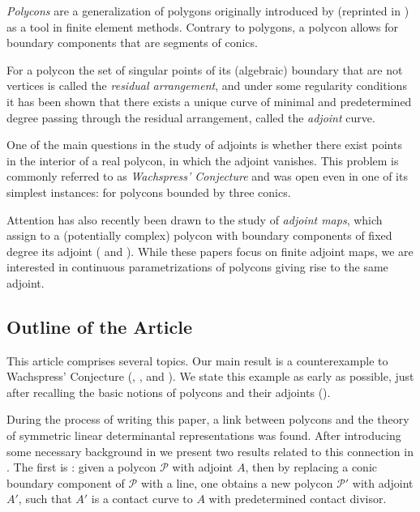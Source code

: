 \documentclass[a4paper,10pt]{amsart}
\theoremstyle{definition}
\theoremstyle{plain}
\newcommand{\cP}{{\mathcal P}}
\begin{document}
\emph{Polycons} are a generalization of polygons originally introduced by \cite{Wachspress1975Adjoints} (reprinted in \cite[Part I]{Wachspress2016Adjoints}) as a tool in finite element methods. Contrary to polygons, a polycon allows for boundary components that are segments of conics.

For a polycon the set of singular points of its (algebraic) boundary that are not vertices is called the \emph{residual arrangement}, and under some regularity conditions it has been shown that there exists a unique curve of minimal and predetermined degree passing through the residual arrangement, called the \emph{adjoint} curve.

One of the main questions in the study of adjoints is whether there exist points in the interior of a real polycon, in which the adjoint vanishes. This problem is commonly referred to as \emph{Wachspress' Conjecture} and was open even in one of its simplest instances: for polycons bounded by three conics.

Attention has also recently been drawn to the study of \emph{adjoint maps}, which assign to a (potentially complex) polycon with boundary components of fixed degree its adjoint (\cite{AgostiniPlaumannSinnWesner2024AdjPolypol} and \cite[\S4]{KohnEtAl2024AdjCurves}). While these papers focus on finite adjoint maps, we are interested in continuous parametrizations of polycons giving rise to the same adjoint.



\subsection{Outline of the Article}

This article comprises several topics. Our main result is a counterexample to Wachspress' Conjecture (, , and ). We state this example as early as possible, just after recalling the basic notions of polycons and their adjoints ().

During the process of writing this paper, a link between polycons and the theory of symmetric linear determinantal representations was found. After introducing some necessary background in  we present two results related to this connection in . The first is : given a polycon $\cP$ with adjoint $A$, then by replacing a conic boundary component of $\cP$ with a line, one obtains a new polycon $\cP'$ with adjoint $A'$, such that $A'$ is a contact curve to $A$ with predetermined contact divisor.
\end{document}
